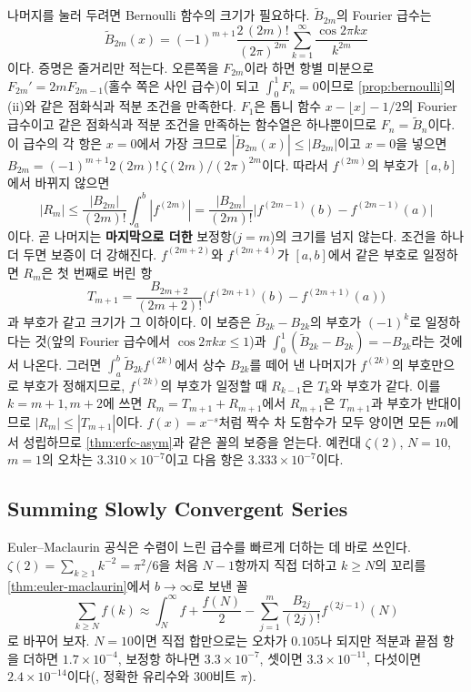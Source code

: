 나머지를 눌러 두려면 Bernoulli 함수의 크기가 필요하다. $\widetilde B_{2m}$의 Fourier 급수는
\[
\widetilde B_{2m}(x)=(-1)^{m+1}\frac{2\,(2m)!}{(2\pi)^{2m}}\sum_{k=1}^\infty\frac{\cos2\pi kx}{k^{2m}}
\]
이다\cite{dlmf}. 증명은 줄거리만 적는다. 오른쪽을 $F_{2m}$이라 하면 항별 미분으로 $F_{2m}'=2mF_{2m-1}$(홀수 쪽은 사인 급수)이 되고 $\int_0^1F_n=0$이므로 \cref{prop:bernoulli}의 (ii)와 같은 점화식과 적분 조건을 만족한다. $F_1$은 톱니 함수 $x-\lfloor x\rfloor-1/2$의 Fourier 급수이고 같은 점화식과 적분 조건을 만족하는 함수열은 하나뿐이므로 $F_n=\widetilde B_n$이다. 이 급수의 각 항은 $x=0$에서 가장 크므로 $|\widetilde B_{2m}(x)|\le|B_{2m}|$이고 $x=0$을 넣으면 $B_{2m}=(-1)^{m+1}2(2m)!\,\zeta(2m)/(2\pi)^{2m}$이다. 따라서 $f^{(2m)}$의 부호가 $[a,b]$에서 바뀌지 않으면
\[
|R_m|\le\frac{|B_{2m}|}{(2m)!}\int_a^b|f^{(2m)}|=\frac{|B_{2m}|}{(2m)!}\bigl|f^{(2m-1)}(b)-f^{(2m-1)}(a)\bigr|
\]
이다. 곧 나머지는 \textbf{마지막으로 더한} 보정항($j=m$)의 크기를 넘지 않는다. 조건을 하나 더 두면 보증이 더 강해진다. $f^{(2m+2)}$와 $f^{(2m+4)}$가 $[a,b]$에서 같은 부호로 일정하면 $R_m$은 첫 번째로 버린 항
\[
T_{m+1}=\frac{B_{2m+2}}{(2m+2)!}\bigl(f^{(2m+1)}(b)-f^{(2m+1)}(a)\bigr)
\]
과 부호가 같고 크기가 그 이하이다. 이 보증은 $\widetilde B_{2k}-B_{2k}$의 부호가 $(-1)^k$로 일정하다는 것(앞의 Fourier 급수에서 $\cos2\pi kx\le1$)과 $\int_0^1(\widetilde B_{2k}-B_{2k})=-B_{2k}$라는 것에서 나온다. 그러면 $\int_a^b\widetilde B_{2k}f^{(2k)}$에서 상수 $B_{2k}$를 떼어 낸 나머지가 $f^{(2k)}$의 부호만으로 부호가 정해지므로, $f^{(2k)}$의 부호가 일정할 때 $R_{k-1}$은 $T_k$와 부호가 같다. 이를 $k=m+1,m+2$에 쓰면 $R_m=T_{m+1}+R_{m+1}$에서 $R_{m+1}$은 $T_{m+1}$과 부호가 반대이므로 $|R_m|\le|T_{m+1}|$이다\cite[9.5절]{graham1994concrete}. $f(x)=x^{-s}$처럼 짝수 차 도함수가 모두 양이면 모든 $m$에서 성립하므로 \cref{thm:erfc-asym}과 같은 꼴의 보증을 얻는다. 예컨대 $\zeta(2)$, $N=10$, $m=1$의 오차는 $3.310\times10^{-7}$이고 다음 항은 $3.333\times10^{-7}$이다.

\subsection{Summing Slowly Convergent Series}

Euler--Maclaurin 공식은 수렴이 느린 급수를 빠르게 더하는 데 바로 쓰인다. $\zeta(2)=\sum_{k\ge1}k^{-2}=\pi^2/6$을 처음 $N-1$항까지 직접 더하고 $k\ge N$의 꼬리를 \cref{thm:euler-maclaurin}에서 $b\to\infty$로 보낸 꼴
\[
\sum_{k\ge N}f(k)\approx\int_N^\infty f+\frac{f(N)}2-\sum_{j=1}^m\frac{B_{2j}}{(2j)!}f^{(2j-1)}(N)
\]
로 바꾸어 보자. $N=10$이면 직접 합만으로는 오차가 $0.105$나 되지만 적분과 끝점 항을 더하면 $1.7\times10^{-4}$, 보정항 하나면 $3.3\times10^{-7}$, 셋이면 $3.3\times10^{-11}$, 다섯이면 $2.4\times10^{-14}$이다(, 정확한 유리수와 $300$비트 $\pi$).


